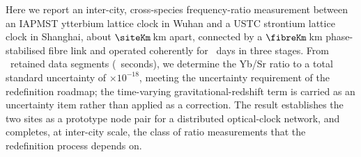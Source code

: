 Here we report an inter-city, cross-species frequency-ratio measurement
between an IAPMST ytterbium lattice clock in Wuhan and a USTC strontium
lattice clock in Shanghai, about $\siteKm$\,km apart, connected by a
$\fibreKm$\,km phase-stabilised fibre link and operated coherently for
\nDays~days in three stages. From \nSeg~retained data segments
(\nSamples~seconds), we determine the Yb/Sr ratio to a total standard
uncertainty of \uTotalShort$\times10^{-18}$, meeting the uncertainty
requirement of the redefinition roadmap; the time-varying
gravitational-redshift term is carried as an uncertainty item rather than
applied as a correction. The result establishes the two sites as a
prototype node pair for a distributed optical-clock network, and completes,
at inter-city scale, the class of ratio measurements that the redefinition
process depends on.
